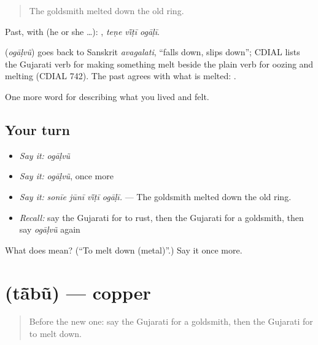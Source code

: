 \begin{quote}
The goldsmith melted down the old ring.
\end{quote}

Past, with  (he or she …):   , \emph{teṇe vī̃ṭī ogāḷī}.

\begin{cousinweb}
\textbf{} (\emph{ogāḷvũ}) goes back to Sanskrit \emph{avagalati}, \textquotedblleft{}falls down, slips down\textquotedblright{}; CDIAL lists the Gujarati verb for making something melt beside the plain verb for oozing and melting (CDIAL 742). The past agrees with what is melted: \textbf{ }.
\end{cousinweb}

\begin{grammarlens}[title={What you've built}]
One more word for describing what you lived and felt.
\end{grammarlens}

\subsection*{Your turn}
\begin{itemize}
\raggedright
  \item \emph{Say it:} \emph{ogāḷvũ}
  \item \emph{Say it:} \emph{ogāḷvũ}, once more
  \item \emph{Say it:} \emph{sonīe jūnī vī̃ṭī ogāḷī.} — The goldsmith melted down the old ring.
  \item \emph{Recall:} say the Gujarati for to rust, then the Gujarati for a goldsmith, then say \emph{ogāḷvũ} again
\end{itemize}

\begin{tcolorbox}[breakable,colback=teal!4,colframe=teal!35!black,title={Before you move on}]
What does  mean? (\textquotedblleft{}To melt down (metal)\textquotedblright{}.) Say it once more.
\end{tcolorbox}
\section[\texorpdfstring{\gu{તાંબું} (tā̃bũ)}{તાંબું (tā̃bũ)}]{ (tā̃bũ) — copper}

\label{lesson:GU-C510-tabu}



\begin{quote}
Before the new one: say the Gujarati for a goldsmith, then the Gujarati for to melt down.
\end{quote}

